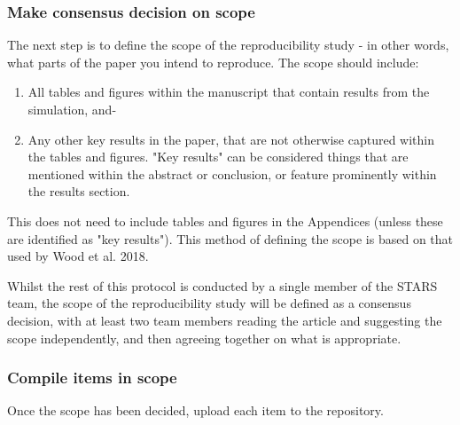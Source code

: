 \subsubsection{Make consensus decision on scope}

The next step is to define the scope of the reproducibility study - in other words, what parts of the paper you intend to reproduce. The scope should include:
\begin{enumerate}[label=(\alph*)]
    \item All tables and figures within the manuscript that contain results from the simulation, and-
    \item Any other key results in the paper, that are not otherwise captured within the tables and figures. "Key results" can be considered things that are mentioned within the abstract or conclusion, or feature prominently within the results section.
\end{enumerate}

This does not need to include tables and figures in the Appendices (unless these are identified as "key results"). This method of defining the scope is based on that used by Wood et al. 2018.\autocite{wood_replication_2018, wood_push_2018}

Whilst the rest of this protocol is conducted by a single member of the STARS team, the scope of the reproducibility study will be defined as a consensus decision, with at least two team members reading the article and suggesting the scope independently, and then agreeing together on what is appropriate.

\subsubsection{Compile items in scope}
\timeyes

Once the scope has been decided, upload each item to the repository.


